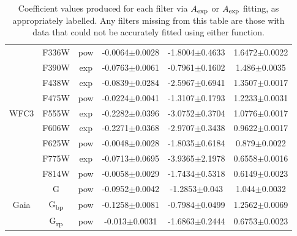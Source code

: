 \documentclass[12pt, a4paper]{report}
\begin{document}
\begin{table}
\begin{center}
\begin{tabular}{cccccc}
& F336W & pow & -0.0064$\pm$0.0028 & -1.8004$\pm$0.4633 & 1.6472$\pm$0.0022 \\
& F390W & exp & -0.0763$\pm$0.0061 & -0.7961$\pm$0.1602 & 1.486$\pm$0.0035 \\
& F438W & exp & -0.0839$\pm$0.0284 & -2.5967$\pm$0.6941 & 1.3507$\pm$0.0017 \\
& F475W & pow & -0.0224$\pm$0.0041 & -1.3107$\pm$0.1793 & 1.2233$\pm$0.0031 \\
WFC3 & F555W & exp & -0.2282$\pm$0.0396 & -3.0752$\pm$0.3704 & 1.0776$\pm$0.0017 \\
& F606W & exp & -0.2271$\pm$0.0368 & -2.9707$\pm$0.3438 & 0.9622$\pm$0.0017 \\
& F625W & pow & -0.0048$\pm$0.0028 & -1.8035$\pm$0.6184 & 0.879$\pm$0.0022 \\
& F775W & exp & -0.0713$\pm$0.0695 & -3.9365$\pm$2.1978 & 0.6558$\pm$0.0016 \\
& F814W & pow & -0.0058$\pm$0.0029 & -1.7434$\pm$0.5318 & 0.6149$\pm$0.0023 \\ \hline

& G & pow & -0.0952$\pm$0.0042 & -1.2853$\pm$0.043 & 1.044$\pm$0.0032 \\
Gaia & G\textsubscript{bp} & pow & -0.1258$\pm$0.0081 & -0.7984$\pm$0.0499 & 1.2562$\pm$0.0069 \\
& G\textsubscript{rp} & pow & -0.013$\pm$0.0031 & -1.6863$\pm$0.2444 & 0.6753$\pm$0.0023 \\ \hline

\end{tabular}
\caption{Coefficient values produced for each filter via $A_{\textnormal{exp}}$ or $A_{\textnormal{exp}}$ fitting, as appropriately labelled. Any filters missing from this table are those with data that could not be accurately fitted using either function.}
\label{simpfunc_coeffs_table}
\end{center}
\end{table}
\end{document}
